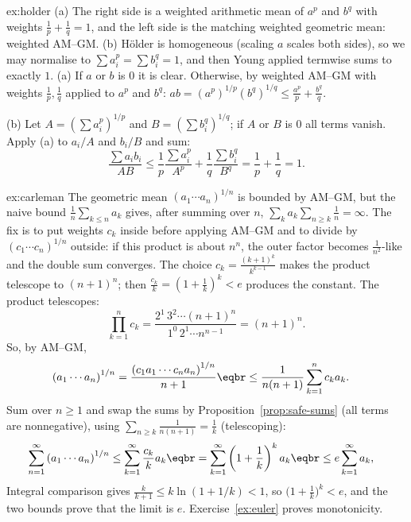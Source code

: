 \begin{solution}{ex:holder}
\idea (a) The right side is a weighted arithmetic mean of $a^p$ and $b^q$ with weights $\frac1p+\frac1q=1$, and the left side is the matching weighted geometric mean: weighted AM--GM. (b) H\"older is homogeneous (scaling $a$ scales both sides), so we may normalise to $\sum a_i^p=\sum b_i^q=1$, and then Young applied termwise sums to exactly $1$.
\writeup (a) If $a$ or $b$ is $0$ it is clear. Otherwise, by weighted AM--GM with weights $\frac1p,\frac1q$ applied to $a^p$ and $b^q$:
$ab=(a^p)^{1/p}(b^q)^{1/q}\le\frac{a^p}p+\frac{b^q}q$.

(b) Let $A=\left(\sum a_i^p\right)^{1/p}$ and $B=\left(\sum b_i^q\right)^{1/q}$; if $A$ or $B$ is $0$ all terms vanish. Apply (a) to $a_i/A$ and $b_i/B$ and sum:
\[
\frac{\sum a_ib_i}{AB}\le\frac1p\frac{\sum a_i^p}{A^p}+\frac1q\frac{\sum b_i^q}{B^q}=\frac1p+\frac1q=1.
\]
\end{solution}

\begin{solution}{ex:carleman}
\idea The geometric mean $(a_1\cdots a_n)^{1/n}$ is bounded by AM--GM, but the naive bound $\frac1n\sum_{k\le n}a_k$ gives, after summing over $n$, $\sum_ka_k\sum_{n\ge k}\frac1n=\infty$. The fix is to put weights $c_k$ inside before applying AM--GM and to divide by $(c_1\cdots c_n)^{1/n}$ outside: if this product is about $n^n$, the outer factor becomes $\frac1{n^2}$-like and the double sum converges. The choice $c_k=\frac{(k+1)^k}{k^{k-1}}$ makes the product telescope to $(n+1)^n$; then $\frac{c_k}k=\left(1+\frac1k\right)^k<e$ produces the constant.
\writeup The product telescopes:
\[\prod_{k=1}^nc_k=\frac{2^1\,3^2\cdots(n+1)^n}{1^0\,2^1\cdots n^{n-1}}=(n+1)^n.\]
So, by AM--GM,
\[
\begin{aligned}\left(a_1\cdots a_n\right)^{1/n}&=\frac{\left(c_1a_1\cdots c_na_n\right)^{1/n}}{n+1}\eqbr\le\frac1{n(n+1)}\sum_{k=1}^nc_ka_k.\end{aligned}
\]
Sum over $n\ge1$ and swap the sums by Proposition~\ref{prop:safe-sums} (all terms are nonnegative), using $\sum_{n\ge k}\frac1{n(n+1)}=\frac1k$ (telescoping):
\[
\begin{aligned}\sum_{n=1}^\infty\left(a_1\cdots a_n\right)^{1/n}&\le\sum_{k=1}^\infty\frac{c_k}ka_k\eqbr=\sum_{k=1}^\infty\left(1+\frac1k\right)^ka_k\eqbr\le e\sum_{k=1}^\infty a_k,\end{aligned}
\]
Integral comparison gives $\frac{k}{k+1}\le k\ln(1+1/k)<1$, so $\bigl(1+\frac1k\bigr)^k<e$, and the two bounds prove that the limit is $e$. Exercise~\ref{ex:euler} proves monotonicity.
\end{solution}

